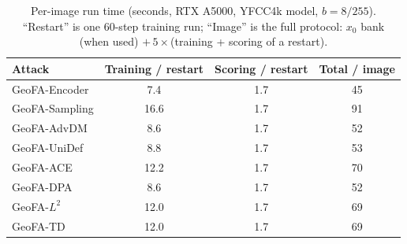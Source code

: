 \begin{table}[h]
\centering\small
\caption{Per-image run time (seconds, RTX A5000, YFCC4k model, $b=8/255$). ``Restart'' is
one $60$-step training run; ``Image'' is the full protocol: $x_0$ bank (when used)
$+\,5\times$(training + scoring of a restart).}
\label{tab:runtime}
\begin{tabular}{lccc}
\toprule
Attack & Training / restart & Scoring / restart & Total / image \\
\midrule
GeoFA-Encoder  &  7.4 & 1.7 & 45 \\
GeoFA-Sampling & 16.6 & 1.7 & 91 \\
GeoFA-AdvDM    &  8.6 & 1.7 & 52 \\
GeoFA-UniDef   &  8.8 & 1.7 & 53 \\
GeoFA-ACE      & 12.2 & 1.7 & 70 \\
GeoFA-DPA      &  8.6 & 1.7 & 52 \\
GeoFA-$L^2$    & 12.0 & 1.7 & 69 \\
GeoFA-TD       & 12.0 & 1.7 & 69 \\
\bottomrule
\end{tabular}
\end{table}
